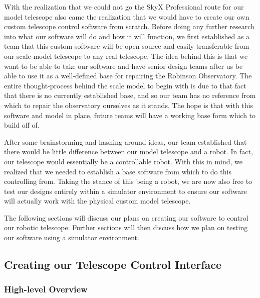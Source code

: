 \documentclass[12pt]{report}
\begin{document}
With the realization that we could not go the SkyX Professional route for our model telescope also came the realization that we would have to create our own custom telescope control software from scratch. Before doing any further research into what our software will do and how it will function, we first established as a team that this custom software will be open-source and easily transferable from our scale-model telescope to any real telescope. The idea behind this is that we want to be able to take our software and have senior design teams after us be able to use it as a well-defined base for repairing the Robinson Observatory. The entire thought-process behind the scale model to begin with is due to that fact that there is no currently established base, and so our team has no reference from which to repair the observatory ourselves as it stands. The hope is that with this software and model in place, future teams will have a working base form which to build off of. 

After some brainstorming and hashing around ideas, our team established that there would be little difference between our model telescope and a robot. In fact, our telescope would essentially be a controllable robot. With this in mind, we realized that we needed to establish a base software from which to do this controlling from. Taking the stance of this being a robot, we are now also free to test our designs entirely within a simulator environment to ensure our software will actually work with the physical custom model telescope.  

The following sections will discuss our plans on creating our software to control our robotic telescope. Further sections will then discuss how we plan on testing our software using a simulator environment.

\subsection*{Creating our Telescope Control Interface}

\subsubsection*{High-level Overview}
\end{document}
